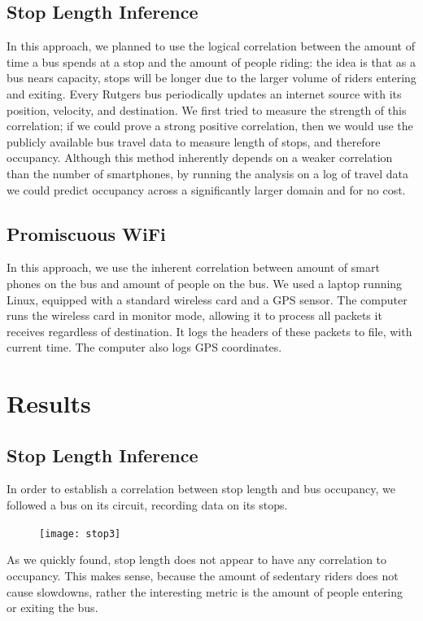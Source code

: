 \documentclass[letterpaper]{scrartcl}
\begin{document}
	\subsection*{Stop Length Inference}

	In this approach, we planned to use the logical correlation between the amount of time a bus spends at a stop and the amount of people riding: the idea is that as a bus nears capacity, stops will be longer due to the larger volume of riders entering and exiting.
	Every Rutgers bus periodically updates an internet source with its position, velocity, and destination.
	We first tried to measure the strength of this correlation; if we could prove a strong positive correlation, then we would use the publicly available bus travel data to measure length of stops, and therefore occupancy.
	Although this method inherently depends on a weaker correlation than the number of smartphones, by running the analysis on a log of travel data we could predict occupancy across a significantly larger domain and for no cost.

	\subsection*{Promiscuous WiFi}

	In this approach, we use the inherent correlation between amount of smart phones on the bus and amount of people on the bus.
	We used a laptop running Linux, equipped with a standard wireless card and a GPS sensor.
	The computer runs the wireless card in monitor mode, allowing it to process all packets it receives regardless of destination. It logs the headers of these packets to file, with current time.
	The computer also logs GPS coordinates.

\section*{Results}

\subsection*{Stop Length Inference}
	In order to establish a correlation between stop length and bus occupancy, we followed a bus on its circuit, recording data on its stops.
	\begin{figure}[H]
	\texttt{[image: stop3]}
	\centering
	\end{figure}
	As we quickly found, stop length does not appear to have any correlation to occupancy.
	This makes sense, because the amount of sedentary riders does not cause slowdowns, rather the interesting metric is the amount of people entering or exiting the bus.
\end{document}
